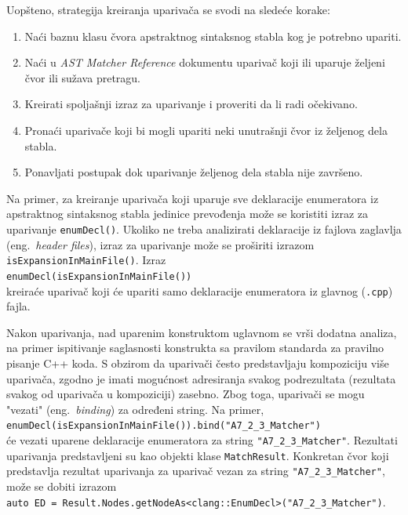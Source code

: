 \documentclass[12pt,oneside]{memoir}
\begin{document}
Uopšteno, strategija kreiranja upariva\v{c}a se svodi na sledeće korake:
\begin{enumerate}
\item Na\'{c}i baznu klasu \v{c}vora apstraktnog sintaksnog stabla kog je potrebno upariti.
 
\item Na\'{c}i u \textit{AST Matcher Reference} dokumentu \cite{ASTMatcherReference} upariva\v{c} koji ili uparuje \v{z}eljeni čvor ili su\v{z}ava pretragu.
\item Kreirati spoljašnji izraz za uparivanje i proveriti da li radi o\v{c}ekivano.
\item Prona\'{c}i upariva\v{c}e koji bi mogli upariti neki unutrašnji čvor iz željenog dela stabla.
\item Ponavljati postupak dok uparivanje željenog dela stabla nije završeno.
\end{enumerate}

\par
Na primer, za kreiranje upariva\v{c}a koji uparuje sve deklaracije enumeratora iz apstraktnog sintaksnog stabla jedinice prevođenja mo\v{z}e se koristiti izraz za uparivanje \texttt{enumDecl()}. Ukoliko ne treba analizirati deklaracije iz fajlova zaglavlja (eng.~\textit{header files}), izraz za uparivanje mo\v{z}e se pro\v{s}iriti izrazom \texttt{isExpansionIn\-MainFile()}. Izraz \\ \texttt{enumDecl(isExpansionInMainFile())} \\ kreira\'{c}e upariva\v{c} koji \'{c}e upariti samo deklaracije enumeratora iz glavnog (\texttt{.cpp}) fajla.

Nakon uparivanja, nad uparenim konstruktom uglavnom se vr\v{s}i dodatna analiza, na primer ispitivanje saglasnosti konstrukta sa pravilom standarda za pravilno pisanje C++ koda.
S obzirom da upariva\v{c}i \v{c}esto predstavljaju kompoziciju vi\v{s}e upariva\v{c}a, zgodno je imati mogu\'{c}nost adresiranja svakog podrezultata (rezultata svakog od upariva\v{c}a u kompoziciji) zasebno.
Zbog toga, upariva\v{c}i se mogu "vezati" (eng.~\textit{binding}) za određeni string. Na primer, \\
\texttt{enumDecl(isExpansionInMainFile()).bind("A7\_2\_3\_Matcher")} \\ će vezati uparene deklaracije enumeratora za string \texttt{"A7\_2\_3\_Matcher"}. Rezultati uparivanja predstavljeni su kao objekti klase \texttt{MatchResult}. Konkretan \v{c}vor koji predstavlja rezultat uparivanja za upariva\v{c} vezan za string \texttt{"A7\_2\_3\_Matcher"},
mo\v{z}e se dobiti izrazom \\ \texttt{auto ED = Result.Nodes.getNodeAs<clang::EnumDecl>("A7\_2\_3\_Matcher")}.
\end{document}
